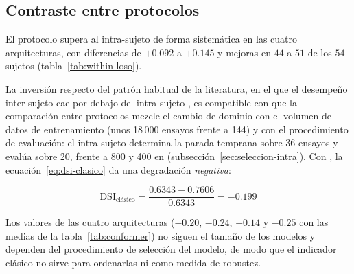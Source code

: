 \subsection{Contraste entre protocolos}
\label{sec:within-vs-loso}

El protocolo \loso{} supera al intra-sujeto de forma sistemática en las cuatro arquitecturas, con
diferencias de $+0.092$ a $+0.145$ y mejoras en $44$ a $51$ de los $54$ sujetos
(tabla~\ref{tab:within-loso}).

\begin{table}[H]
\centering
\caption{Contraste entre validación intra-sujeto y \loso{}, pareado por participante, con la media
de las tres semillas de cada participante en los dos protocolos. El intervalo es de percentiles del
remuestreo de participantes.}
\label{tab:within-loso}
\small
{}
\end{table}

La inversión respecto del patrón habitual de la literatura, en el que el desempeño inter-sujeto cae
por debajo del intra-sujeto \cite{zhu2025hafusenet,li2026survey,brookshire2024}, es compatible con
que la comparación entre protocolos mezcle el cambio de dominio con el volumen de datos de
entrenamiento (unos 18\,000 ensayos frente a 144) y con el procedimiento de evaluación: el
intra-sujeto determina la parada temprana sobre 36 ensayos y evalúa sobre 20, frente a 800 y 400
en \loso{} (subsección~\ref{sec:seleccion-intra}). Con \eegnet{}, la ecuación~\eqref{eq:dsi-clasico} da
una degradación \emph{negativa}:

\begin{equation*}
\mathrm{DSI}_{\text{clásico}} = \frac{0.6343 - 0.7606}{0.6343} = -0.199
\end{equation*}

Los valores de las cuatro arquitecturas ($-0.20$, $-0.24$, $-0.14$ y $-0.25$ con las medias de la
tabla~\ref{tab:conformer}) no siguen el tamaño de los modelos y dependen del procedimiento de selección
del modelo, de modo que el indicador clásico no sirve para ordenarlas ni como medida de robustez.

